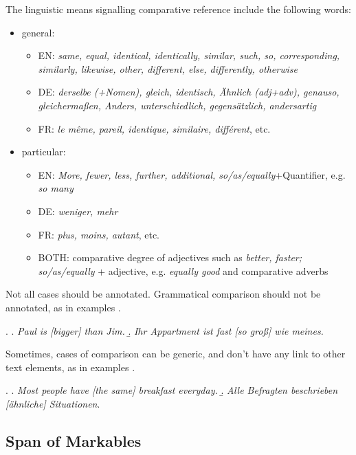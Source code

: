 \documentclass[a4paper]{article}
\begin{document}
The linguistic means signalling comparative reference include the following words: 

\begin{itemize}
\item general: 
\begin{itemize}
\item EN: {\sl same, equal, identical, identically, similar, such, so, corresponding, similarly, likewise, other, different, else,
differently, otherwise}
\item DE: {\sl derselbe (+Nomen), gleich, identisch, Ähnlich (adj+adv), genauso, gleichermaßen, Anders, unterschiedlich, gegensätzlich, andersartig}
\item FR: \textsl{le même, pareil, identique, similaire, différent}, etc.
\end{itemize}
\item particular:

\begin{itemize}
\item EN: {\sl More, fewer, less, further, additional, so/as/equally}+Quantifier, e.g. {\sl so many}
\item DE: {\sl weniger, mehr}
\item FR: \textsl{plus, moins, autant}, etc.
\item BOTH: comparative degree of adjectives such as {\sl better, faster; so/as/equally} + 
adjective, e.g. {\sl equally good} and comparative adverbs
\end{itemize}
\end{itemize}

Not all cases should be annotated. %
Grammatical comparison should not be annotated, as in examples \Next[a-b].

\ex.
\a. {\sl Paul is [bigger] than Jim.}
\b. {\sl Ihr Appartment ist fast [so groß] wie meines.}

Sometimes, cases of comparison can be generic, and don't have any link to other text elements, as in examples \Next[a-b].

\ex.
\a. {\sl Most people have [the same] breakfast everyday.}
\b. {\sl Alle Befragten beschrieben [ähnliche] Situationen}.


\subsection{Span of Markables}
\end{document}
